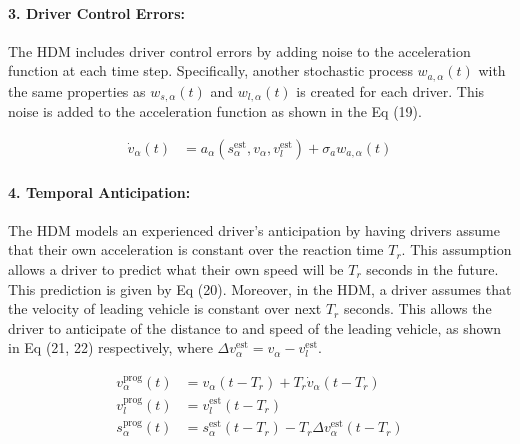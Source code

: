 \documentclass[12pt]{article}
\begin{document}
\paragraph{3. Driver Control Errors:}
The HDM includes driver control errors by adding noise to the acceleration function at each time step.  Specifically, another stochastic process $w_{a,\alpha}(t)$ with the same properties as $w_{s,\alpha}(t)$ and  $w_{l,\alpha}(t)$ is created for each driver.  This noise is added to the acceleration function as shown in the Eq (19).
\begin{mymathbox}[ams gather, title=Driver Control Error Equation Equations,colframe=blue!30!black]
  \begin{align}
\dot v_\alpha(t)&=a_\alpha(s_\alpha^\text{est},v_\alpha,v_l^\text{est})+\sigma_a w_{a,\alpha}(t)
  \end{align}
\end{mymathbox}
\paragraph{4. Temporal Anticipation:}
The HDM models an experienced driver's anticipation by having drivers assume that their own acceleration is constant over the reaction time $T_r$.  This assumption allows a driver to predict what their own speed will be $T_r$ seconds in the future.  This prediction is given by Eq (20).  Moreover, in the HDM, a driver assumes that the velocity of leading vehicle is constant over next $T_r$ seconds.  This allows the driver to anticipate of the distance to and speed of the leading vehicle, as shown in Eq (21, 22) respectively, where $\Delta v_\alpha^\text{est}=v_\alpha-v_l^\text{est}$.
\begin{mymathbox}[ams gather, title=Temporal Anticipation Equations,colframe=blue!30!black]
  \begin{align}
  v_\alpha^{\text{prog}}(t)&=v_\alpha(t-T_r)+T_r\dot v_\alpha(t-T_r)\\
  v_l^{\text{prog}}(t)&=v_l^\text{est}(t-T_r)\\
  s_\alpha^{\text{prog}}(t)&=s_\alpha^\text{est}(t-T_r)-T_r\Delta v_\alpha^\text{est}(t-T_r)
  \end{align}
\end{mymathbox}
\end{document}

